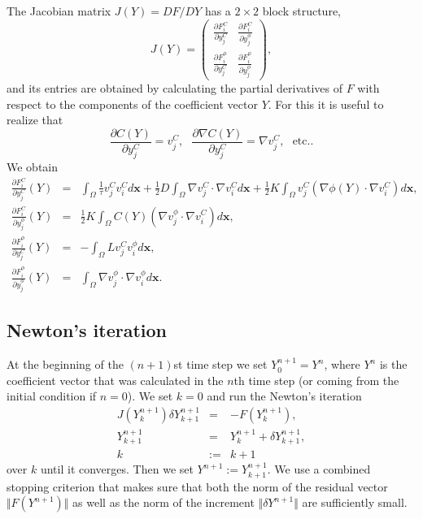 The Jacobian matrix $J(Y) = DF/DY$ has a $2\times 2$ block structure,
\begin{equation}
J(Y) = \left(
\begin{array}{cc}
  \displaystyle \frac{\partial F_i^C}{\partial y_j^C} & \displaystyle \frac{\partial F_i^C}{\partial y_j^{\phi}} \\ 
  \displaystyle \frac{\partial F_i^{\phi}}{\partial y_j^C} & \displaystyle \frac{\partial F_i^{\phi}}{\partial y_j^{\phi}}
\end{array}
\right),
\end{equation}
and its entries are obtained by calculating the partial derivatives of $F$ with
respect to the components of the coefficient vector $Y$. For this it is useful to 
realize that 
$$
\frac{\partial C(Y)}{\partial y_j^C} = v_j^C, \ \ \ 
\frac{\partial \nabla C(Y)}{\partial y_j^C} = \nabla v_j^C,\ \ \ \mbox{etc.}.
$$
We obtain
\begin{eqnarray}
  \frac{\partial F_i^C}{\partial y_j^C}(Y) &=& 
  \int_{\Omega} \frac{1}{\tau} v_j^C v_i^C d\mathbf{x} + 
  \frac 12 D\int_{\Omega} \nabla v_j^C \cdot \nabla v_i^C d\mathbf{x}
  + \frac 12 K\int_{\Omega} v_j^C \left(\nabla \phi(Y) \cdot \nabla v_i^C\right) d\mathbf{x},\label{eq:dFcdyc}\\
  \frac{\partial F_i^C}{\partial y_j^{\phi}}(Y) &=&
  \frac 12 K \int_{\Omega} C(Y) \left(\nabla v_j^{\phi} \cdot \nabla v_i^C\right) d\mathbf{x},\\
  \frac{\partial F_i^{\phi}}{\partial y_j^C}(Y) &=&
  - \int_{\Omega} L v_j^C v_i^{\phi} d\mathbf{x},\\
  \frac{\partial F_i^{\phi}}{\partial y_j^{\phi}}(Y) &=&
  \int_{\Omega} \nabla v_j^{\phi} \cdot \nabla v_i^{\phi} d\mathbf{x}\label{eq:dFphidyphi}.
\end{eqnarray}

\subsection{Newton's iteration}
At the beginning of the $(n+1)$st time step we 
set $Y^{n+1}_0 = Y^n$, where $Y^n$ is the coefficient vector  
that was calculated in the $n$th time step (or coming from the 
initial condition if $n = 0$). We set $k = 0$ and run the 
Newton's iteration 
\begin{eqnarray*}
J(Y^{n+1}_k) \delta Y^{n+1}_{k+1} &=& -F(Y^{n+1}_k), \\ 
Y^{n+1}_{k+1} &=& Y^{n+1}_k + \delta Y^{n+1}_{k+1}, \\
k &:=& k+1
\end{eqnarray*}
over $k$ until it converges. Then we set $Y^{n+1} := Y^{n+1}_{k+1}$. 
We use a combined stopping criterion 
that makes sure that both the norm of the residual vector $\Vert F(Y^{n+1})\Vert$ 
as well as the norm of the increment $\Vert \delta Y^{n+1}\Vert$ are sufficiently 
small.

